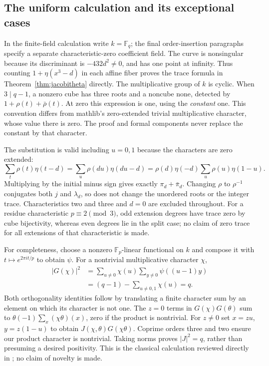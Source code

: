 \documentclass[11pt]{article}
\theoremstyle{definition}\newtheorem{definition}[theorem]{Definition}
\theoremstyle{remark}\newtheorem{remark}[theorem]{Remark}
\begin{document}
\subsection{The uniform calculation and its exceptional cases}
In the finite-field calculation write $k=\mathbb F_q$; the final order-insertion paragraphs specify a separate characteristic-zero coefficient field. The curve is nonsingular because its discriminant is $-432d^2\ne0$, and has one point at infinity. Thus counting $1+\eta(x^3-d)$ in each affine fiber proves the trace formula in Theorem~\ref{thm:jacobitheta} directly. The multiplicative group of $k$ is cyclic. When $3\mid q-1$, a nonzero cube has three roots and a noncube none, detected by $1+\rho(t)+\bar\rho(t)$. At zero this expression is one, using the \emph{constant} one. This convention differs from mathlib's zero-extended trivial multiplicative character, whose value there is zero. The proof and formal components never replace the constant by that character.

The substitution is valid including $u=0,1$ because the characters are zero extended:
\[
 \sum_t\rho(t)\eta(t-d)
 =\sum_u\rho(du)\eta(du-d)
 =\rho(d)\eta(-d)\sum_u\rho(u)\eta(1-u).
\]
Multiplying by the initial minus sign gives exactly $\pi_d+\bar\pi_d$. Changing $\rho$ to $\rho^{-1}$ conjugates both $j$ and $\lambda_d$, so does not change the unordered roots or the integer trace. Characteristics two and three and $d=0$ are excluded throughout. For a residue characteristic $p\equiv2\pmod3$, odd extension degrees have trace zero by cube bijectivity, whereas even degrees lie in the split case; no claim of zero trace for all extensions of that characteristic is made.

For completeness, choose a nonzero $\mathbb F_p$-linear functional on $k$ and compose it with $t\mapsto e^{2\pi it/p}$ to obtain $\psi$. For a nontrivial multiplicative character $\chi$,
\[
 \begin{aligned}
 |G(\chi)|^2
 &=\sum_{u\ne0}\chi(u)\sum_{y\ne0}\psi((u-1)y)\\
 &=(q-1)-\sum_{u\ne0,1}\chi(u)=q.
 \end{aligned}
\]
Both orthogonality identities follow by translating a finite character sum by an element on which its character is not one. The $z=0$ terms in $G(\chi)G(\theta)$ sum to $\theta(-1)\sum_x(\chi\theta)(x)$, zero if the product is nontrivial. For $z\ne0$ set $x=zu$, $y=z(1-u)$ to obtain $J(\chi,\theta)G(\chi\theta)$. Coprime orders three and two ensure our product character is nontrivial. Taking norms proves $|J|^2=q$, rather than presuming a desired positivity. This is the classical calculation reviewed directly in \cite{WeilJacobi}; no claim of novelty is made.
\end{document}

